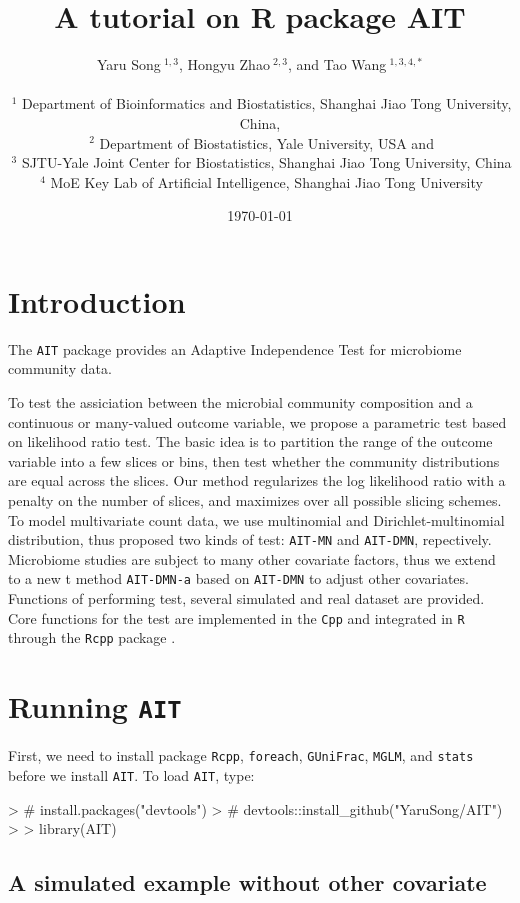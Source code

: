 \documentclass[a4paper,11pt]{article}
\title{A tutorial on R package AIT}
\author{Yaru Song$~^{1,3}$, Hongyu Zhao$~^{2,3}$, and Tao Wang$~^{1,3,4,*}$ \\
\\
$~^1$ Department of Bioinformatics and Biostatistics, Shanghai Jiao Tong University, China, \\
$~^2$ Department of Biostatistics, Yale University, USA and \\
$~^3$ SJTU-Yale Joint Center for Biostatistics, Shanghai Jiao Tong University, China\\
$~^4$ MoE Key Lab of Artificial Intelligence, Shanghai Jiao Tong University\\
}
\date{\today}
\newcommand{\Rcode}[1]{{\texttt{#1}}}
\begin{document}

\setlength{\parskip}{0.8\baselineskip}

\maketitle

\section{Introduction}
\label{sec:intro}

The \texttt{AIT} package provides an Adaptive Independence Test for microbiome community data.

To test the assiciation between the microbial community composition and a continuous or many-valued outcome variable, we propose a parametric test based on likelihood ratio test. The basic idea is to partition the range of the outcome variable into a few slices or bins, then test whether the community distributions are equal across the slices. Our method regularizes the log likelihood ratio with a penalty on the number of slices, and maximizes over all possible slicing schemes. To model multivariate count data, we use multinomial and Dirichlet-multinomial distribution, thus proposed two kinds of test: \Rcode{AIT-MN} and \Rcode{AIT-DMN}, repectively. Microbiome studies are subject to many other covariate factors, thus we extend to a new t method \Rcode{AIT-DMN-a} based on  \Rcode{AIT-DMN} to adjust other covariates. Functions of performing test, several simulated and real dataset are provided. Core functions for the test are implemented in the \texttt{Cpp} and integrated in \texttt{R} through the \texttt{Rcpp} package \citep{eddelbuettel2011rcpp}.

\section{Running \texttt{AIT}}
\label{sec:example1}

First, we need to install package \texttt{Rcpp}, \texttt{foreach}, \texttt{GUniFrac}, \texttt{MGLM}, and \texttt{stats} before we install \texttt{AIT}. To load \texttt{AIT},
type:
\begin{Schunk}
\begin{Sinput}
> # install.packages("devtools")
> # devtools::install_github("YaruSong/AIT")
> 
> library(AIT)
\end{Sinput}
\end{Schunk}


\subsection{A simulated example without other covariate}
\end{document}
